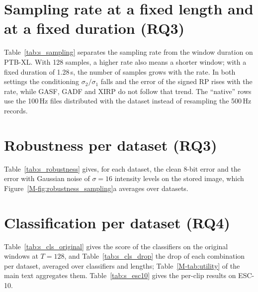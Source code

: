 \documentclass[preprint,12pt]{elsarticle}
\begin{document}
\section{Sampling rate at a fixed length and at a fixed duration (RQ3)}\label{sec:s_sampling}
Table~\ref{tab:s_sampling} separates the sampling rate from the window duration on PTB-XL. With 128 samples, a higher rate also means a shorter window; with a fixed duration of 1.28\,s, the number of samples grows with the rate. In both settings the conditioning $\sigma_2/\sigma_1$ falls and the error of the signed RP rises with the rate, while GASF, GADF and XIRP do not follow that trend. The ``native'' rows use the 100\,Hz files distributed with the dataset instead of resampling the 500\,Hz records.

\begin{table}[H]
\centering
\caption{PTB-XL, anti-aliased resampling from 500\,Hz: median $\sigma_2/\sigma_1$ of the RP states, share of series below $0.1$, and mean 8-bit NMAE.}\label{tab:s_sampling}
\scriptsize
\setlength{\tabcolsep}{1.8pt}

\end{table}

\section{Robustness per dataset (RQ3)}\label{sec:s_robustness}
Table~\ref{tab:s_robustness} gives, for each dataset, the clean 8-bit error and the error with Gaussian noise of $\sigma=16$ intensity levels on the stored image, which Figure~\ref{M-fig:robustness_sampling}a averages over datasets.

\begin{table}[H]
\centering
\caption{Mean 8-bit NMAE at $T=128$: clean / with noise of $\sigma=16$ (200 windows per dataset, two replicates). Sipers' decoder reads the circular RP.}\label{tab:s_robustness}
\scriptsize
\setlength{\tabcolsep}{3pt}

\end{table}

\section{Classification per dataset (RQ4)}\label{sec:s_classification}
Table~\ref{tab:s_cls_original} gives the score of the classifiers on the original windows at $T=128$, and Table~\ref{tab:s_cls_drop} the drop of each combination per dataset, averaged over classifiers and lengths; Table~\ref{M-tab:utility} of the main text aggregates them. Table~\ref{tab:s_esc10} gives the per-clip results on ESC-10.
\end{document}
